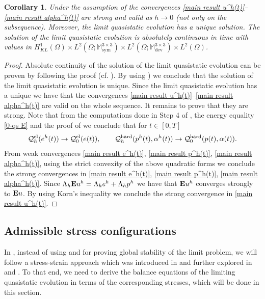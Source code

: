 \documentclass[reqno,10pt]{amsart}
\numberwithin{equation}{section}
\newtheorem{corollary}[theorem]{Corollary}
\theoremstyle{remark}
\newcommand{\RED}{\color{black}}
\newcommand{\BLACK}{\color{black}}
\newcommand{\M}{\mathbb{M}}
\newcommand{\calQ}{\mathcal{Q}}
\DeclareMathOperator{\dev}{dev}
\DeclareMathOperator{\sym}{sym}
\newcommand{\E}{{\bf E}}
\begin{document}
\begin{corollary} \label{improved convergence} 
Under the assumption of \Cref{main result 1}{\RED,\BLACK} the convergences \eqref{main result u^h(t)}--\eqref{main result alpha^h(t)} are strong and valid as $h \to 0$ (not only on the subsequence). Moreover, the limit quasistatic evolution has a unique solution. The solution of the limit quasistatic evolution is absolutely continuous in time with values in $H^1_{KL}(\Omega) \times L^2(\Omega;\M^{3 \times 3}_{\sym})\times L^2(\Omega;\M^{3 \times 3}_{\dev}) \times L^2(\Omega)$. 
\end{corollary}

\begin{proof}
Absolute continuity of the solution of the limit quasistatic evolution can be proven by following the proof \cite[Theorem 5.2]{DalMaso.DeSimone.Mora.2006} (cf. ). By using \cite[Theorem 3.5.2]{Mielke.Roubicek.2015}) we conclude that the solution of the limit quasistatic evolution is unique.
Since the limit quasistatic evolution has a unique we have that the convergences \eqref{main result u^h(t)}--\eqref{main result alpha^h(t)} are valid on the whole sequence. It remains to prove that they are strong. Note that from the computations done in Step 4 of , the energy equality \ref{0-qs E} and the proof of  we conclude that for $t \in [0,T]$
\[
	\calQ^{\rm el}_{h}(e^h(t))\to \calQ^{\rm el}_{0}(e(t)), \qquad \calQ^{\rm hard}_{h}(p^h(t), \alpha^h(t)) \to \calQ^{\rm hard}_{0}(p(t), \alpha(t)).
\]
From weak convergences \eqref{main result e^h(t)}, \eqref{main result p^h(t)}, \eqref{main result alpha^h(t)}, using the strict convexity of the above quadratic forms we conclude the strong convergences in \eqref{main result e^h(t)}, \eqref{main result p^h(t)}, \eqref{main result alpha^h(t)}. 
Since $\Lambda_h {\E}u^h =\Lambda_h e^h+\Lambda_h p^h$ we have that ${\E}u^h$ converges strongly to ${\E}u$. 
By using Korn's inequality we conclude the strong convergence in \eqref{main result u^h(t)}.
\end{proof}

\subsection{Admissible stress configurations} \label{Admissible stress configurations}

In , instead of using  and  for proving global stability of the limit problem, we will follow a stress-strain approach which was introduced in \cite{Francfort.Giacomini.2014} and further explored in \cite{Buzancic.Davoli.Velcic.2024.1st} and \cite{Buzancic.Davoli.Velcic.2024.2nd}.
To that end, we need to derive the balance equations of the limiting quasistatic evolution in terms of the corresponding stresses, which will be done in this section.
\end{document}
